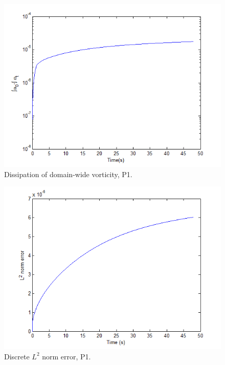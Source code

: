 \documentclass[letterpaper,12pt]{report}
\begin{document}
\begin{figure}
\centering
\includegraphics[width=5in]{wtot_Inner_NM5_K6_delt02_delpt2.PNG}
\caption{\label{fig:wtotP1}Dissipation of domain-wide vorticity, P1.}
\end{figure}

\begin{figure}
\centering
\includegraphics[width=5in]{L2_Inner_NM5_K6_delt02_delpt2.PNG}
\caption{\label{fig:L2P1}Discrete $L^2$ norm error, P1.}
\end{figure}
\end{document}
